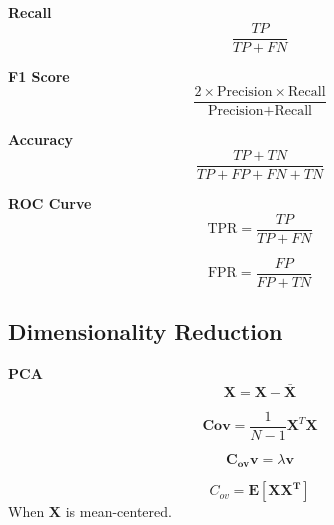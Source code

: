 \documentclass[8pt]{article}
\begin{document}
\begin{multicols}{2}
\textbf{Recall}
\begin{equation}
    \frac{TP}{TP + FN}
\end{equation}

\textbf{F1 Score}
\begin{equation}
    \frac{2 \times \text{Precision} \times \text{Recall}}{\text{Precision} + \text{Recall}}
\end{equation}

\textbf{Accuracy}
\begin{equation}
    \frac{TP + TN}{TP + FP + FN + TN}
\end{equation}

\textbf{ROC Curve}
\begin{equation}
    \text{TPR} = \frac{TP}{TP + FN}
\end{equation}

\begin{equation}
    \text{FPR} = \frac{FP}{FP + TN}
\end{equation}

\subsection*{Dimensionality Reduction}
\textbf{PCA}
\begin{equation}
    \mathbf{X} = \mathbf{X} - \bar{\mathbf{X}}
\end{equation}

\begin{equation}
    \mathbf{Cov} = \frac{1}{N - 1} \mathbf{X}^T \mathbf{X}
\end{equation}

\begin{equation}
    \mathbf{C_{ov}} \mathbf{v} = \lambda \mathbf{v}
\end{equation}

\begin{equation}
    C_{ov} = \mathbf{E}[\mathbf{XX^T}]
\end{equation}
When $\mathbf{X}$ is mean-centered.

\end{multicols}
\end{document}
